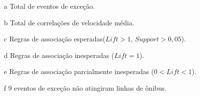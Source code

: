 \documentclass[
	12pt,				%
	oneside,			%
	a4paper,			%
	english,			%
	brazil				%
	]{abntex2ppgsi}
\begin{document}
{{\begin{apendicesenv}
\begin{table}[!htb]
\begin{threeparttable}
\begin{tablenotes}
            \item[a] Total de eventos de exceção.
            \item[b] Total de correlações de velocidade média.
            \item[c] Regras de associação esperadas($Lift > 1$, $Support > 0,05$).
            \item[d] Regras de associação inesperadas ($Lift = 1$).
            \item[e] Regras de associação parcialmente inesperadas ($0 < Lift < 1$).
            \item[f] 9 eventos de exceção não atingiram linhas de ônibus.
        \end{tablenotes}
\end{threeparttable}
\end{table}


\end{apendicesenv}}}
\end{document}
